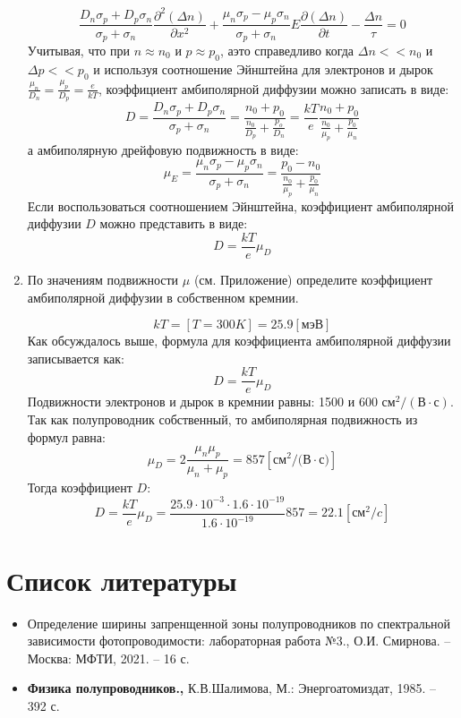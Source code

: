 \documentclass[a4paper, 12pt]{article}
\begin{document}
\begin{enumerate}
    \begin{equation}
        \frac{D_n \sigma_p +D_p \sigma_n}{\sigma_p + \sigma_n} \frac{\partial^2(\Delta n)}{\partial x^2} +\frac{\mu_n \sigma_p - \mu_p \sigma_n}{\sigma_p +\sigma_n}E\frac{\partial(\Delta n)}{\partial t} - \frac{\Delta n}{\tau} = 0
    \end{equation}
    Учитывая, что при $n \approx n_0$ и $p \approx p_0$,  аэто справедливо когда $\Delta n <<n_0 $ и $\Delta p << p_0 $ и используя соотношение Эйнштейна для электронов и дырок $\frac{\mu_n}{D_n} = \frac{\mu_p}{D_p} = \frac{e}{kT}$, коэффициент амбиполярной диффузии можно записать в виде:
    \begin{equation}
        D = \frac{D_n \sigma_p + D_p \sigma_n}{\sigma_p + \sigma_n} = \frac{n_0+p_0}{\frac{n_0}{D_p}+ \frac{p_o}{D_n}} = \frac{kT}{e}\frac{n_0+p_0}{\frac{n_0}{\mu_p}+\frac{p_0}{\mu_n}}
    \end{equation}
    а амбиполярную дрейфовую подвижность в виде:
    \begin{equation}
        \mu_E = \frac{\mu_n \sigma_p - \mu_p \sigma_n}{\sigma_p +\sigma_n} = \frac{p_0-n_0}{\frac{n_0}{\mu_p} + \frac{p_0}{\mu_n}}     
    \end{equation}
    Если воспользоваться соотношением Эйнштейна, коэффициент амбиполярной диффузии $D $ можно представить в виде:
    \[
    D = \frac{kT}{e} \mu_D
    \]
    \item По значениям подвижности  $\mu$ (см. Приложение) определите коэффициент амбиполярной диффузии в собственном кремнии.\par
    \[kT = [T=300K] = 25.9 [\text{мэВ}]\]
    Как обсуждалось выше, формула для коэффициента амбиполярной диффузии записывается как:
    \[
    D = \frac{kT}{e} \mu_D
    \]
    Подвижности электронов и дырок в кремнии равны: 1500 и 600 $\text{см}^2/(\text{В} \cdot \text{с})$. Так как полупроводник собственный, то амбиполярная подвижность из формул равна:
    \[
    \mu_D = 2\frac{\mu_n \mu_p}{\mu_n + \mu_p} = 857  [\text{см}^2/(\text{В}\cdot \text{с)}]
    \]
    Тогда коэффициент $D$:
    \[
    D = \frac{kT}{e} \mu_D = \frac{25.9 \cdot 10^{-3} \cdot 1.6 \cdot 10^{-19}}{1.6\cdot10^{-19}} 857 = 22.1 [\text{см}^2/c]
    \]
    
\end{enumerate}
\section{Список литературы}
\begin{itemize}
    \item Определение ширины запренщенной зоны полупроводников по спектральной зависимости фотопроводимости: лабораторная работа №3., О.И. Смирнова. -- Москва: МФТИ, 2021. -- 16 с.
    \item \textbf{Физика полупроводников.,} К.В.Шалимова, М.: Энергоатомиздат, 1985. -- 392 с.
\end{itemize}
\end{document}
